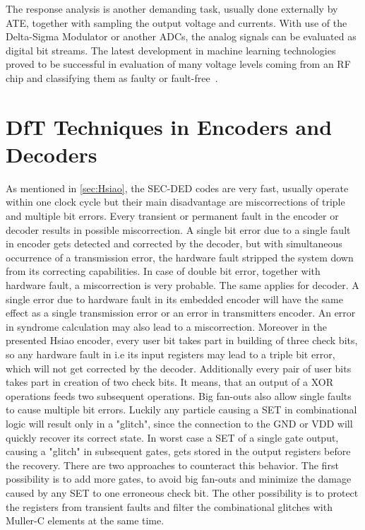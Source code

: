 The response analysis is another demanding task, usually done externally by ATE, together with sampling the output voltage and currents. With use of the Delta-Sigma Modulator or another ADCs, the analog signals can be evaluated as digital bit streams. The latest development in machine learning technologies proved to be successful in evaluation of many voltage levels coming from an RF chip and classifying them as faulty or fault-free~\cite{art:neural}.

\section{DfT Techniques in Encoders and Decoders}

As mentioned in \autoref{sec:Hsiao}, the SEC-DED codes are very fast, usually operate within one clock cycle but their main disadvantage are miscorrections of triple and multiple bit errors. Every transient or permanent fault in the encoder or decoder results in possible miscorrection. A single bit error due to a single fault in encoder gets detected and corrected by the decoder, but with simultaneous occurrence of a transmission error, the hardware fault stripped the system down from its correcting capabilities. In case of double bit error, together with hardware fault, a miscorrection is very probable. The same applies for decoder. A single error due to hardware fault in its embedded encoder will have the same effect as a single transmission error or an error in transmitters encoder. An error in syndrome calculation may also lead to a miscorrection. Moreover in the presented Hsiao encoder, every user bit takes part in building of three check bits, so any hardware fault in i.e its input registers may lead to a triple bit error, which will not get corrected by the decoder. Additionally every pair of user bits takes part in creation of two check bits. It means, that an output of a XOR operations feeds two subsequent operations. Big fan-outs also allow single faults to cause multiple bit errors. Luckily any particle causing a SET in combinational logic will result only in a "glitch", since the connection to the GND or VDD will quickly recover its correct state. In worst case a SET of a single gate output, causing a "glitch" in subsequent gates, gets stored in the output registers before the recovery. There are two approaches to counteract this behavior. The first possibility is to add more gates, to avoid big fan-outs and minimize the damage caused by any SET to one erroneous check bit. The other possibility is to protect the registers from transient faults and filter the combinational glitches with Muller-C elements at the same time\cite{art:Dicorato}.

